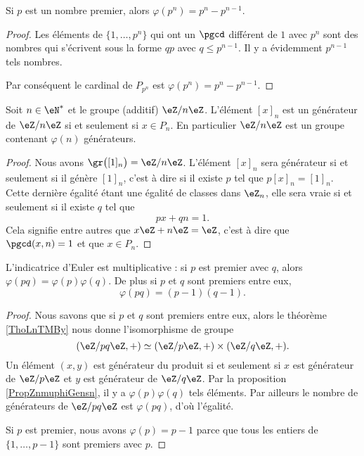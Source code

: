 \begin{lemma}
    Si \( p\) est un nombre premier, alors \( \varphi(p^n)=p^n-p^{n-1}\).
\end{lemma}

\begin{proof}
    Les éléments de \( \{ 1,\ldots,p^n \}\) qui ont un \( \pgcd\) différent de \( 1\) avec \( p^n\) sont des nombres qui s'écrivent sous la forme \( qp\) avec \( q\leq p^{n-1}\). Il y a évidemment \( p^{n-1}\) tels nombres.

    Par conséquent le cardinal de \( P_{p^n}\) est \( \varphi(p^{n})=p^n-p^{n-1}\).
\end{proof}

\begin{proposition}     \label{PropZnmuphiGensn}
    Soit \( n\in\eN^*\) et le groupe (additif) \( \eZ/n\eZ\). L'élément \( [x]_n\) est un générateur de \( \eZ/n\eZ\) si et seulement si \( x\in P_n\). En particulier \( \eZ/n\eZ\) est un groupe contenant \( \varphi(n)\) générateurs.
\end{proposition}

\begin{proof}
    Nous avons \( \gr\big( [1]_n \big)=\eZ/n\eZ\). L'élément \( [x]_n\) sera générateur si et seulement si il génère \( [1]_n \), c'est à dire si il existe \( p\) tel que \( p[x]_n=[1]_n\). Cette dernière égalité étant une égalité de classes dans \( \eZ_n\), elle sera vraie si et seulement si il existe \( q\) tel que
    \begin{equation}
        px+qn=1.
    \end{equation}
    Cela signifie entre autres que \( x\eZ+n\eZ=\eZ\), c'est à dire que \( \pgcd(x,n)=1\) et que \( x\in P_n\).
\end{proof}

\begin{corollary}       \label{CorlvTmsf}
    L'indicatrice d'Euler est multiplicative : si \( p\) est premier avec \( q\), alors \( \varphi(pq)=\varphi(p)\varphi(q)\). De plus si \( p\) et \( q\) sont premiers entre eux,
    \begin{equation}
        \varphi(pq)=(p-1)(q-1).
    \end{equation}
\end{corollary}

\begin{proof}
    Nous savons que si \( p\) et \( q\) sont premiers entre eux, alors le théorème \ref{ThoLnTMBy} nous donne l'isomorphisme de groupe
    \begin{equation}
        (\eZ/pq\eZ,+)\simeq(\eZ/p\eZ,+)\times(\eZ/q\eZ,+).
    \end{equation}
    Un élément \( (x,y)\) est générateur du produit si et seulement si \( x\) est générateur de \( \eZ/p\eZ\) et \( y\) est générateur de \( \eZ/q\eZ\). Par la proposition \ref{PropZnmuphiGensn}, il y a \( \varphi(p)\varphi(q)\) tels éléments. Par ailleurs le nombre de générateurs de \( \eZ/pq\eZ\) est \( \varphi(pq)\), d'où l'égalité.

    Si \( p\) est premier, nous avons \( \varphi(p)=p-1\) parce que tous les entiers de \( \{ 1,\ldots, p-1 \}\) sont premiers avec \( p\).
\end{proof}

